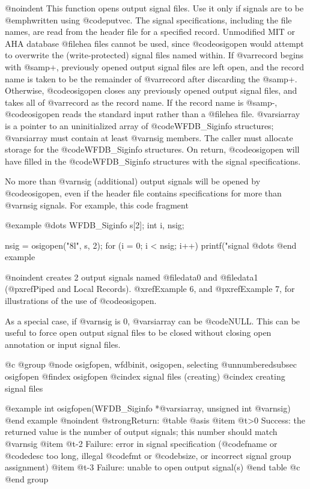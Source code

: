 {{{{{{{{@noindent
This function opens output signal files.  Use it only if signals are to
be @emph{written} using @code{putvec}.  The signal specifications,
including the file names, are read from the header file for a
specified record.  Unmodified MIT or AHA database @file{hea} files
cannot be used, since @code{osigopen} would attempt to overwrite the
(write-protected) signal files named within.  If @var{record} begins
with @samp{+}, previously opened output signal files are left open, and
the record name is taken to be the remainder of @var{record} after
discarding the @samp{+}.  Otherwise, @code{osigopen} closes any
previously opened output signal files, and takes all of @var{record} as
the record name.  If the record name is @samp{-}, @code{osigopen} reads
the standard input rather than a @file{hea} file.  @var{siarray} is a
pointer to an uninitialized array of @code{WFDB_Siginfo} structures;
@var{siarray} must contain at least @var{nsig} members.  The caller must
allocate storage for the @code{WFDB_Siginfo} structures.  On return,
@code{osigopen} will have filled in the @code{WFDB_Siginfo} structures with
the signal specifications.

No more than @var{nsig} (additional) output signals will be opened by
@code{osigopen}, even if the header file contains specifications for
more than @var{nsig} signals.  For example, this code fragment

@example
@dots{}
WFDB_Siginfo s[2];
int i, nsig;

nsig = osigopen("8l", s, 2);
for (i = 0; i < nsig; i++)
    printf("signal %
@dots{}
@end example

@noindent
creates 2 output signals named @file{data0} and @file{data1}
(@pxref{Piped and Local Records}).  @xref{Example 6}, and @pxref{Example 7},
for illustrations of the use of @code{osigopen}.

As a special case, if @var{nsig} is 0, @var{siarray} can be @code{NULL}.
This can be useful to force open output signal files to be closed
without closing open annotation or input signal files.

@c @group
@node     osigfopen, wfdbinit, osigopen, selecting
@unnumberedsubsec osigfopen
@findex osigfopen
@cindex signal files (creating)
@cindex creating signal files

@example
int osigfopen(WFDB_Siginfo *@var{siarray}, unsigned int @var{nsig})
@end example
@noindent
@strong{Return:}
@table @asis
@item @t{>0}
Success: the returned value is the number of output signals;  this number
should match @var{nsig}
@item @t{-2}
Failure: error in signal specification (@code{fname} or @code{desc} too
long, illegal @code{fmt} or @code{bsize}, or incorrect signal group
assignment)
@item @t{-3}
Failure: unable to open output signal(s)
@end table
@c @end group

}}}}}}}}
